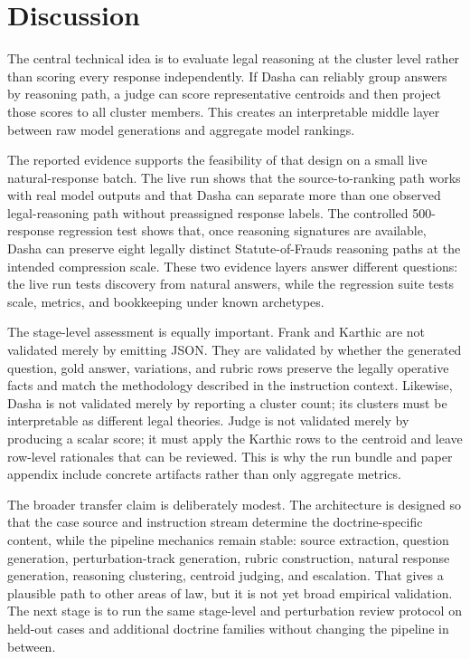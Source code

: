 \section{Discussion}

The central technical idea is to evaluate legal reasoning at the cluster level
rather than scoring every response independently. If Dasha can reliably group
answers by reasoning path, a judge can score representative centroids and then
project those scores to all cluster members. This creates an interpretable
middle layer between raw model generations and aggregate model rankings.

The reported evidence supports the feasibility of that design on a small
live natural-response batch. The live run shows that the source-to-ranking path
works with real model outputs and that Dasha can separate more than one observed
legal-reasoning path without preassigned response labels. The controlled
500-response regression test shows that, once reasoning signatures are
available, Dasha can preserve eight legally distinct Statute-of-Frauds reasoning
paths at the intended compression scale. These two evidence layers answer
different questions: the live run tests discovery from natural answers, while
the regression suite tests scale, metrics, and bookkeeping under known
archetypes.

The stage-level assessment is equally important. Frank and Karthic are not
validated merely by emitting JSON. They are validated by whether the generated
question, gold answer, variations, and rubric rows preserve the legally
operative facts and match the methodology described in the instruction context.
Likewise, Dasha is not validated merely by reporting a cluster count; its
clusters must be interpretable as different legal theories. Judge is not
validated merely by producing a scalar score; it must apply the Karthic rows to
the centroid and leave row-level rationales that can be reviewed. This is why
the run bundle and paper appendix include concrete artifacts rather than only
aggregate metrics.

The broader transfer claim is deliberately modest. The architecture is designed
so that the case source and instruction stream determine the doctrine-specific
content, while the pipeline mechanics remain stable: source extraction,
question generation, perturbation-track generation, rubric construction,
natural response generation, reasoning clustering, centroid judging, and
escalation. That gives a plausible path to other areas of law, but it is not
yet broad empirical validation. The next stage is to run the same stage-level
and perturbation review protocol on held-out cases and additional doctrine
families without changing the pipeline in between.

